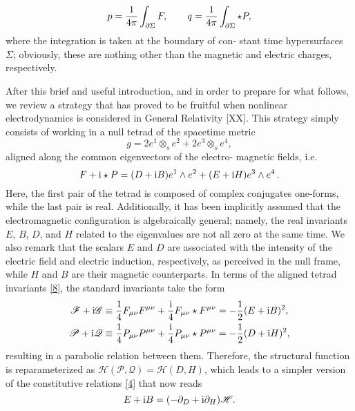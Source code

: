 \begin{equation}\label{6}
  p=\frac{1}{4\pi }\int_{\partial\Sigma}F,\qquad q=\frac{1}{4\pi }\int_{\partial\Sigma}\star P, 
\end{equation}
where the integration is taken at the boundary of con-
stant time hypersurfaces $\Sigma $; obviously, these are nothing other than the magnetic and electric charges, respectively.

After this brief and useful introduction, and in order to prepare for what follows, we review a strategy that has proved to be fruitful when nonlinear electrodynamics is considered in General Relativity [XX]. This strategy simply consists of working in a null tetrad of the spacetime metric
\begin{equation}\label{7}
  g=2e^1\otimes_s e^2+2e^3\otimes_s e^4, 
\end{equation}
aligned along the common eigenvectors of the electro-
magnetic fields, i.e.
\begin{equation}\label{8}
  F+\mathrm{i}  \star P=(D+\mathrm{i} B)e^1\wedge e^2+(E+\mathrm{i} H)e^3\wedge e^4\,  .
\end{equation}
Here, the first pair of the tetrad is composed of complex conjugates one-forms, while the last pair is real. Additionally, it has been implicitly assumed that the electromagnetic configuration is algebraically general; namely, the real invariants $E$, $B$, $D$, and $H$ related to the eigenvalues are not all zero at the same time. We also remark that the scalars $E$ and $D$ are associated with the intensity of the electric field and electric induction, respectively, as perceived in the null frame, while $H$ and $B$ are their magnetic counterparts. In terms of the aligned tetrad invariants \eqref{8}, the standard invariants take the form
\begin{subequations}\label{9}
	\begin{align}
  \mathscr{F}+\mathrm{i} \mathscr{G}&\equiv \frac{1}{4}F_{\mu\nu }F^{\mu\nu }+\frac{\mathrm{i} }{4}F_{\mu\nu}\star F^{\mu\nu }=-\frac{1}{2}(E+\mathrm{i} B)^2,\\
  \mathscr{P}+\mathrm{i} \mathscr{Q}&\equiv \frac{1}{4}P_{\mu\nu }P^{\mu\nu }+\frac{\mathrm{i} }{4}P_{\mu\nu}\star P^{\mu\nu }=-\frac{1}{2}(D+\mathrm{i} H)^2,
\end{align}
\end{subequations}
resulting in a parabolic relation between them. Therefore, the structural function is reparameterized as $\mathscr{H}(\mathscr{P},\mathscr{Q})=\mathscr{H}(D,H)$, which leads to a simpler version of the constitutive relations \eqref{4} that now reads
\begin{equation}\label{10}
  E+\mathrm{i} B=(-\partial_D+\mathrm{i} \partial_H)\mathscr{H}.
\end{equation}
